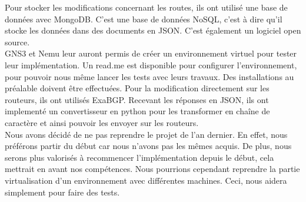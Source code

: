 Pour stocker les modifications concernant les routes, ils ont utilisé une base de données avec MongoDB. C'est une base de données NoSQL, c'est à dire qu'il stocke les données dans des documents en JSON. C'est également un logiciel open source.
\\ \indent
GNS3 et Nemu leur auront permis de créer un environnement virtuel pour tester leur implémentation. Un read.me est disponible pour configurer l'environnement, pour pouvoir nous même lancer les tests avec leurs travaux. Des installations au préalable doivent être effectuées.
Pour la modification directement sur les routeurs, ils ont utilisés ExaBGP. Recevant les réponses en JSON, ils ont implementé un convertisseur en python pour les transformer en chaîne de caractère et ainsi pouvoir les envoyer sur les routeurs. \\ \indent
Nous avons décidé de ne pas reprendre le projet de l'an dernier. En effet, nous préférons partir du début car nous n'avons pas les mêmes acquis. De plus, nous serons plus valorisés à recommencer l'implémentation depuis le début, cela mettrait en avant nos compétences. Nous pourrions cependant reprendre la partie virtualisation d'un environnement avec différentes machines. Ceci, nous aidera simplement pour faire des tests.